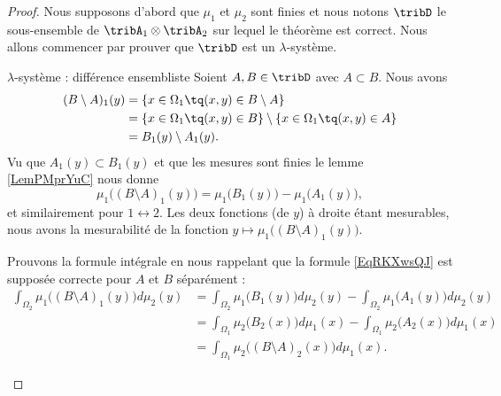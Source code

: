 \begin{proof}
    Nous supposons d'abord que \( \mu_1\) et \( \mu_2\) sont finies et nous notons \( \tribD\) le sous-ensemble de \( \tribA_1\otimes \tribA_2\) sur lequel le théorème est correct. Nous allons commencer par prouver que \( \tribD\) est un \( \lambda\)-système.

    \begin{subproof}
        \item[\( \lambda\)-système : différence ensembliste]
            Soient \( A,B\in\tribD\) avec \( A\subset B\). Nous avons
            \begin{subequations}
                \begin{align}
                    (B\setminus A)_1(y)&=\{ x\in \Omega_1\tq(x,y)\in B\setminus A \}\\
                    &=\{ x\in \Omega_1\tq(x,y)\in B\}\setminus\{ x\in \Omega_1\tq(x,y)\in  A \}\\
                    &=B_1(y)\setminus A_1(y).
                \end{align}
            \end{subequations}
            Vu que \( A_1(y)\subset B_1(y)\) et que les mesures sont finies le lemme \ref{LemPMprYuC} nous donne
            \begin{equation}
                \mu_1\big( (B\setminus A)_1(y) \big)=\mu_1\big( B_1(y) \big)-\mu_1\big( A_1(y) \big),
            \end{equation}
            et similairement pour \( 1\leftrightarrow 2\). Les deux fonctions (de \( y\)) à droite étant mesurables, nous avons la mesurabilité de la fonction \( y\mapsto \mu_1\big( (B\setminus A)_1(y) \big)\).

            Prouvons la formule intégrale en nous rappelant que la formule \eqref{EqRKXwsQJ} est supposée correcte pour \( A\) et \( B\) séparément :
            \begin{subequations}
                \begin{align}
                    \int_{\Omega_2}\mu_1\big( (B\setminus A)_1(y) \big)d\mu_2(y)&=\int_{\Omega_2}\mu_1\big( B_1(y) \big)d\mu_2(y)-\int_{\Omega_2}\mu_1\big( A_1(y) \big)d\mu_2(y)\\
                    &=\int_{\Omega_1}\mu_2\big( B_2(x) \big)d\mu_1(x)-\int_{\Omega_1}\mu_2\big( A_2(x) \big)d\mu_1(x)\\
                    &=\int_{\Omega_1}\mu_2\big( (B\setminus A)_2(x) \big)d\mu_1(x).
                \end{align}
            \end{subequations}
            

\end{subproof}
\end{proof}
